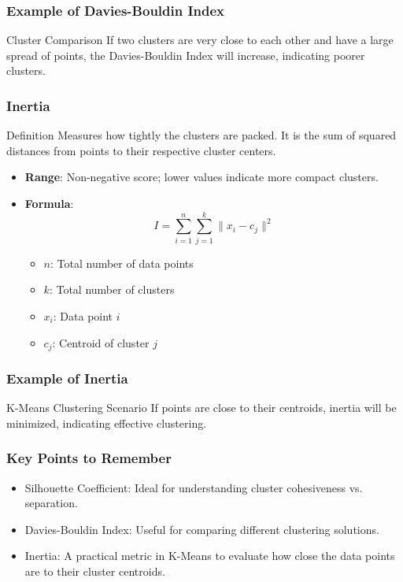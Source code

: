 \documentclass[aspectratio=169]{beamer}
\begin{document}
\begin{frame}[fragile]
    \frametitle{Example of Davies-Bouldin Index}
    \begin{block}{Cluster Comparison}
        If two clusters are very close to each other and have a large spread of points, the Davies-Bouldin Index will increase, indicating poorer clusters.
    \end{block}
\end{frame}

\begin{frame}[fragile]
    \frametitle{Inertia}
    \begin{block}{Definition}
        Measures how tightly the clusters are packed. It is the sum of squared distances from points to their respective cluster centers.
    \end{block}
    \begin{itemize}
        \item \textbf{Range}: Non-negative score; lower values indicate more compact clusters.
        \item \textbf{Formula}:
        \[
        I = \sum_{i=1}^{n} \sum_{j=1}^{k} \| x_i - c_j \|^2
        \]
        \begin{itemize}
            \item \( n \): Total number of data points
            \item \( k \): Total number of clusters
            \item \( x_i \): Data point \( i \)
            \item \( c_j \): Centroid of cluster \( j \)
        \end{itemize}
    \end{itemize}
\end{frame}

\begin{frame}[fragile]
    \frametitle{Example of Inertia}
    \begin{block}{K-Means Clustering Scenario}
        If points are close to their centroids, inertia will be minimized, indicating effective clustering.
    \end{block}
\end{frame}

\begin{frame}[fragile]
    \frametitle{Key Points to Remember}
    \begin{itemize}
        \item Silhouette Coefficient: Ideal for understanding cluster cohesiveness vs. separation.
        \item Davies-Bouldin Index: Useful for comparing different clustering solutions.
        \item Inertia: A practical metric in K-Means to evaluate how close the data points are to their cluster centroids.
    \end{itemize}
\end{frame}
\end{document}
